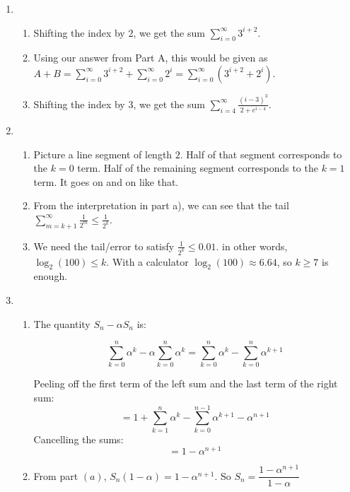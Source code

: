 \begin{enumerate}
    \item
    \begin{enumerate}
        \item Shifting the index by 2, we get the sum $\displaystyle \sum_{i=0}^\infty 3^{i+2}$.

        \item Using our answer from Part A, this would be given as $\displaystyle A+B = \sum_{i=0}^\infty 3^{i+2} + \sum_{i=0}^\infty 2^i = \sum_{i=0}^\infty \left(3^{i+2} + 2^i\right)$.

        \item Shifting the index by 3, we get the sum $\displaystyle \sum_{i=4}^\infty \frac{(i-3)^3}{2+e^{i-4}}$.
    \end{enumerate}
    
    \item \begin{enumerate}
        \item 
    Picture a line segment of length $2$. Half of that segment corresponds to the $k=0$ term. Half of the remaining segment corresponds to the $k=1$ term. It goes on and on like that. 

    \item From the interpretation in part a), we can see that the tail $\sum_{m=k+1}^\infty \frac{1}{2^m} \leq \frac{1}{2^k}$. 

    \item We need the tail/error to satisfy $\frac{1}{2^k}\leq 0.01$. in other words, $\log_2(100)\leq k$. With a calculator $\log_2(100) \approx 6.64$, so $k\geq 7$ is enough. 

    \end{enumerate}

    \item 

    \begin{enumerate}
        \item The quantity $S_n - \alpha S_n$ is:

        \[\sum_{k=0}^n\alpha^k - \alpha \sum_{k=0}^n\alpha^k = \sum_{k=0}^n\alpha^k -  \sum_{k=0}^n\alpha^{k+1}\]

        Peeling off the first term of the left sum and the last term of the right sum:
        \[= 1 +\sum_{k=1}^n\alpha^k -\sum_{k=0}^{n-1}\alpha^{k+1}-\alpha^{n+1} \]
        Cancelling the sums:
        \[= 1-\alpha^{n+1}\]

        \item  From part $(a)$, $S_n(1-\alpha)=1-\alpha^{n+1}$. So $S_n = \dfrac{1-\alpha^{n+1}}{1-\alpha}$


\end{enumerate}
\end{enumerate}

